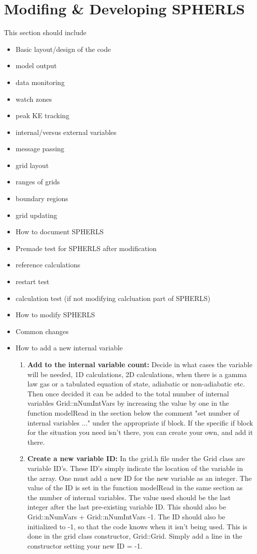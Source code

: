 \documentclass[12pt,a4paper]{book}
\begin{document}
\chapter{Modifing \& Developing SPHERLS}
This section should include
\begin{itemize}
\item Basic layout/design of the code
\item model output
\item data monitoring
\item watch zones
\item peak KE tracking
\item internal/versus external variables
\item message passing
\item grid layout
\item ranges of grids
\item boundary regions
\item grid updating
\item How to document SPHERLS
\item Premade test for SPHERLS after modification
\item reference calculations
\item restart test
\item calculation test (if not modifying calcluation part of SPHERLS)
\item How to modify SPHERLS
\item Common changes
\item How to add a new internal variable
\begin{enumerate}
\item \textbf{Add to the internal variable count:} Decide in what cases the variable will be needed, 1D calculations, 2D calculations, when there is a gamma law gas or a tabulated equation of state, adiabatic or non-adiabatic etc. Then once decided it can be added to the total number of internal variables Grid::nNumIntVars by increasing the value by one in the function modelRead in the section below the comment "set number of internal variables ..." under the appropriate if block. If the specific if block for the situation you need isn't there, you can create your own, and add it there.
\item \textbf{Create a new variable ID:} In the grid.h file under the Grid class are variable ID's. These ID's simply indicate the location of the variable in the array. One must add a new ID for the new variable as an integer. The value of the ID is set in the function modelRead in the same section as the number of internal variables. The value used should be the last integer after the last pre-existing variable ID. This should also be Grid::nNumVars + Grid::nNumIntVars -1. The ID should also be initialized to -1, so that the code knows when it isn't being used. This is done in the grid class constructor, Grid::Grid. Simply add a line in the constructor setting your new ID = -1.

\end{enumerate}
\end{itemize}
\end{document}
